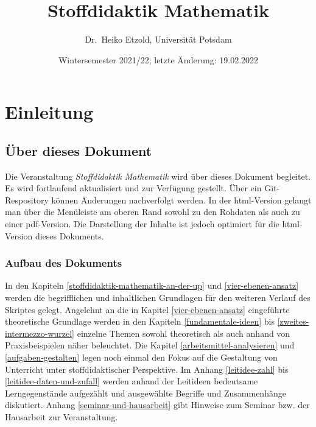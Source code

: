 \documentclass[
  ngerman,
]{scrbook}
\title{Stoffdidaktik Mathematik}
\author{Dr.~Heiko Etzold, Universität Potsdam}
\date{Wintersemester 2021/22; letzte Änderung: 19.02.2022}
\makeatletter
\def\renewtheorem#1{%
  \expandafter\let\csname#1\endcsname\relax
  \expandafter\let\csname c@#1\endcsname\relax
  \gdef\renewtheorem@envname{#1}
  \renewtheorem@secpar
}
\def\renewtheorem@secpar{\@ifnextchar[{\renewtheorem@numberedlike}{\renewtheorem@nonumberedlike}}
\def\renewtheorem@numberedlike[#1]#2{\newtheorem{\renewtheorem@envname}[#1]{#2}}
\def\renewtheorem@nonumberedlike#1{
\def\renewtheorem@caption{#1}
\edef\renewtheorem@nowithin{\noexpand\newtheorem{\renewtheorem@envname}{\renewtheorem@caption}}
\renewtheorem@thirdpar
}
\def\renewtheorem@thirdpar{\@ifnextchar[{\renewtheorem@within}{\renewtheorem@nowithin}}
\def\renewtheorem@within[#1]{\renewtheorem@nowithin[#1]}
\theoremstyle{definition}
\theoremstyle{definition}
\theoremstyle{definition}
\theoremstyle{definition}
\theoremstyle{remark}
\makeatother
\begin{document}
\maketitle

% 

{
\hypersetup{linkcolor=}
\setcounter{tocdepth}{1}
\tableofcontents
}
\hypertarget{part-einleitung}{%
\part*{Einleitung}\label{part-einleitung}}

\hypertarget{uxfcber-dieses-dokument}{%
\chapter*{Über dieses Dokument}\label{uxfcber-dieses-dokument}}

Die Veranstaltung \emph{Stoffdidaktik Mathematik} wird über dieses Dokument begleitet. Es wird fortlaufend aktualisiert und zur Verfügung gestellt. Über ein Git-Respository können Änderungen nachverfolgt werden. In der html-Version gelangt man über die Menüleiste am oberen Rand sowohl zu den Rohdaten als auch zu einer pdf-Version. Die Darstellung der Inhalte ist jedoch optimiert für die html-Version dieses Dokuments.

\hypertarget{aufbau-des-dokuments}{%
\section*{Aufbau des Dokuments}\label{aufbau-des-dokuments}}

In den Kapiteln \ref{stoffdidaktik-mathematik-an-der-up} und \ref{vier-ebenen-ansatz} werden die begrifflichen und inhaltlichen Grundlagen für den weiteren Verlauf des Skriptes gelegt. Angelehnt an die in Kapitel \ref{vier-ebenen-ansatz} eingeführte theoretische Grundlage werden in den Kapiteln \ref{fundamentale-ideen} bis \ref{zweites-intermezzo-wurzel} einzelne Themen sowohl theoretisch als auch anhand von Praxisbeispielen näher beleuchtet. Die Kapitel \ref{arbeitsmittel-analysieren} und \ref{aufgaben-gestalten} legen noch einmal den Fokus auf die Gestaltung von Unterricht unter stoffdidaktischer Perspektive. Im Anhang \ref{leitidee-zahl} bis \ref{leitidee-daten-und-zufall} werden anhand der Leitideen bedeutsame Lerngegenstände aufgezählt und ausgewählte Begriffe und Zusammenhänge diskutiert. Anhang \ref{seminar-und-hausarbeit} gibt Hinweise zum Seminar bzw. der Hausarbeit zur Veranstaltung.
\end{document}
